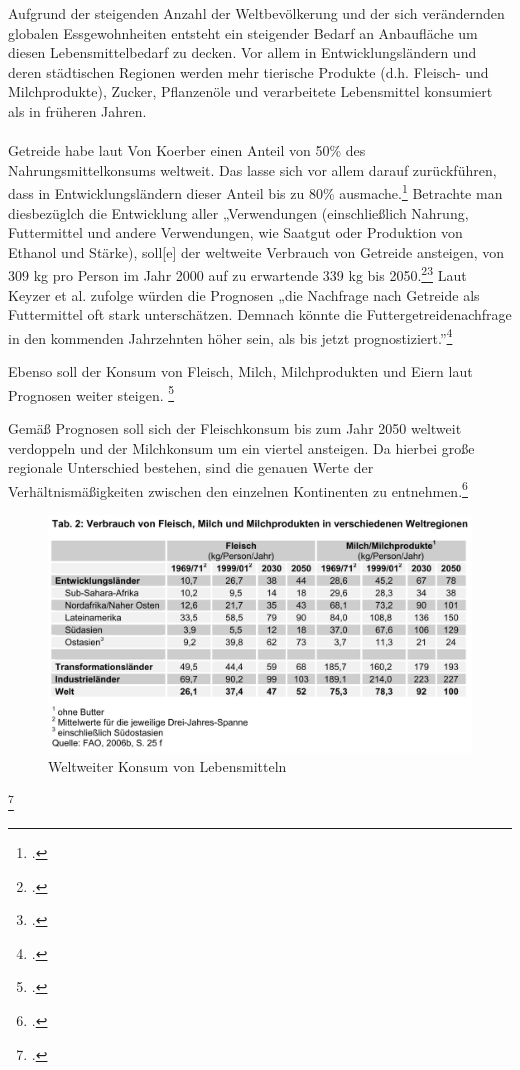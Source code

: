 \documentclass{scrartcl}
\begin{document}
Aufgrund der steigenden Anzahl der Weltbevölkerung und der sich verändernden globalen Essgewohnheiten entsteht ein steigender Bedarf an Anbaufläche um diesen Lebensmittelbedarf zu decken. Vor allem in Entwicklungsländern und deren städtischen Regionen werden mehr tierische Produkte (d.h. Fleisch- und Milchprodukte), Zucker, Pflanzenöle und verarbeitete Lebensmittel konsumiert als in früheren Jahren. \\
\\Getreide habe laut Von Koerber einen Anteil von 50\% des Nahrungsmittelkonsums weltweit. Das lasse sich vor allem darauf zurückführen, dass in Entwicklungsländern dieser Anteil bis zu 80\% ausmache.\footcite[Vgl.][S.4ff]{VonKoerber2008Globale-trends}
Betrachte man diesbezüglch die Entwicklung aller „Verwendungen (einschließlich Nahrung, Futtermittel und andere Verwendungen, wie Saatgut oder Produktion von Ethanol und Stärke), soll[e] der weltweite Verbrauch von Getreide ansteigen, von 309 kg pro Person im Jahr 2000 auf zu erwartende 339 kg bis 2050.\footcite[S.3ff]{VonKoerber2008Globale-trends}\footcite[vgl.][S.23ff]{FAO2006World2030/2050} 
Laut Keyzer et al. zufolge würden die Prognosen „die Nachfrage nach Getreide als Futtermittel oft stark unterschätzen.
Demnach könnte die Futtergetreidenachfrage in den kommenden Jahrzehnten höher sein, als bis jetzt prognostiziert.”\footcite[S.3f]{VonKoerber2008Globale-trends}

Ebenso soll der Konsum von Fleisch, Milch, Milchprodukten und Eiern laut Prognosen weiter steigen. \footcite[Vgl.][S.4f]{VonKoerber2008Globale-trends}

Gemäß Prognosen soll sich der Fleischkonsum bis zum Jahr 2050 weltweit verdoppeln und der Milchkonsum um ein viertel ansteigen. Da hierbei große regionale Unterschied bestehen, sind die genauen Werte der Verhältnismäßigkeiten zwischen den einzelnen Kontinenten \label{fig:konsumweltweit} zu entnehmen.\footcite[Vgl.][S.4]{VonKoerber2008Globale-trends}

\begin{figure}[htbp]
\centering
\includegraphics[width=16cm]{image_folder/KonsumWeltweit.png}
\caption{Weltweiter Konsum von Lebensmitteln}
\label{fig:konsumweltweit}
\end{figure}\footcite[S.4f]{VonKoerber2008Globale-trends}
\end{document}
